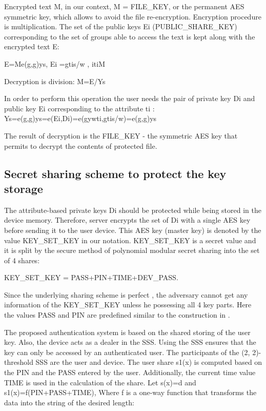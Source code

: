 \documentclass[twocolumn]{svjour3}          %
\begin{document}
Encrypted text M, in our context, M = FILE\_KEY, or the permanent AES symmetric key, which allows to avoid the file re-encryption. Encryption procedure is multiplication. The set of the public keys Ei (PUBLIC\_SHARE\_KEY) corresponding to the set of groups able to access the text is kept along with the encrypted text E:

E=Me(g,g)ys,{ Ei =gtis/w }, i{ti}M

Decryption is division:
M=E/Ys

In order to perform this operation the user needs the pair of private key Di and public key Ei corresponding to the attribute ti :
Ys=e(g,g)ys=e(Ei,Di)=e(gywti,gtis/w)=e(g,g)ys

The result of decryption is the FILE\_KEY - the symmetric AES key that permits to decrypt the contents of protected file. 

\subsection{Secret sharing scheme to protect the key storage }
\label{sec_secret}

The attribute-based private keys Di should be protected while being stored in the device memory. Therefore, server encrypts the set of Di with a single AES key before sending it to the user device. This AES key (master key) is denoted by the value KEY\_SET\_KEY in our notation. KEY\_SET\_KEY is a secret value and it is split by the secure method of polynomial modular secret sharing \cite{galibus2015mobile, galibus2008some} into the set of 4 shares:

KEY\_SET\_KEY = PASS+PIN+TIME+DEV\_PASS. 

Since the underlying sharing scheme is perfect \cite{galibus2008some}, the adversary cannot get any information of the KEY\_SET\_KEY unless he possessing all 4 key parts. Here the values PASS and PIN are predefined similar to the construction in \cite{galibus2015mobile}.

The proposed authentication system is based on the shared storing of the user key. Also, the device acts as a dealer in the SSS. Using the SSS ensures that the key can only be accessed by an authenticated user. The participants of the (2, 2)-threshold SSS are the user and device. The user share s1(x) is computed based on the PIN and the PASS entered by the user. Additionally, the current time value TIME is used in the calculation of the share. Let s(x)=d and s1(x)=f(PIN+PASS+TIME), 
Where f is a one-way function that transforms the data into the string of the desired length: 
\end{document}
